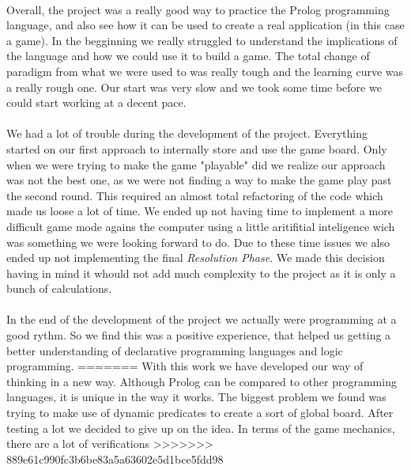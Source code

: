 \documentclass[a4paper]{article}
\begin{document}
\paragraph{}
Overall, the project was a really good way to practice the Prolog programming language, and
also see how it can be used to create a real application (in this case a game). In the 
begginning we really struggled to understand the implications of the language and how 
we could use it to build a game. The total change of paradigm from what we were used to 
was really tough and the learning curve was a really rough one. Our start was very slow 
and we took some time before we could start working at a decent pace.

\paragraph{}
We had a lot of trouble during the development of the project. Everything started on our first
approach to internally store and use the game board. Only when we were trying to make 
the game "playable" did we realize our approach was not the best one, as we were not finding a 
way to make the game play past the second round. This required an almost total refactoring of
the code which made us loose a lot of time. We ended up not having time to implement a more 
difficult game mode agains the computer using a little aritifitial inteligence wich was 
something we were looking forward to do. Due to these time issues we also ended up not implementing
the final \textit{Resolution Phase}. We made this decision having in mind it whould not add much complexity
to the project as it is only a bunch of calculations.

\paragraph{}
In the end of the development of the project we actually were programming at a good rythm. So 
we find this was a positive experience, that helped us getting a better understanding 
of declarative programming languages and logic programming.
=======
With this work we have developed our way of thinking in a new way. Although Prolog can be compared to other programming languages, it is unique in the way it works.
The biggest problem we found was trying to make use of dynamic predicates to create a sort of global board. After testing a lot we decided to give up on the idea.
In terms of the game mechanics, there are a lot of verifications 
>>>>>>> 889e61c990fc3b6be83a5a63602e5d1bce5fdd98


\clearpage
\renewcommand\refname{Apendix}



\newpage
\appendix
\end{document}
